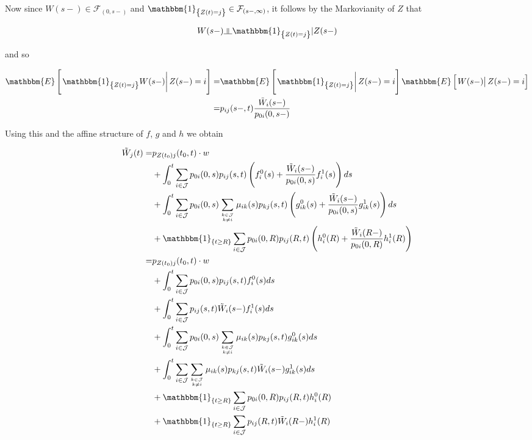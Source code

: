 \documentclass{book}
\newcommand{\indep}{\rotatebox[origin=c]{90}{$\models$}}
\newcommand{\1}[1]{\mathbbm{1}_{\left\lbrace #1 \right\rbrace}}
\newcommand{\econd}[2][def]{\mathbbm{E} \left[ \left. #1 \right| #2 \right]}
\theoremstyle{break}
\theoremstyle{remark}
\numberwithin{equation}{section}
\begin{document}
Now since $W(s-) \in  \mathcal{F}_{\left( 0,s- \right)}$ and $\1{Z(t)=j} \in \mathcal{F}_{\left( s-,\infty \right)}$, it follows by the Markovianity of $Z$ that

\begin{align*}
	W(s-) \indep \1{Z(t)=j} | Z(s-)
\end{align*}

and so

\begin{align*}
	\econd[\1{Z(t)=j}W(s-)]{Z(s-)=i} =& \econd[\1{Z(t)=j}]{Z(s-)=i} \econd[W(s-)]{Z(s-)=i} \\
	=& p_{ij}(s-,t) \frac{\tilde{W}_i(s-)}{p_{0i}(0,s-)}
\end{align*}


Using this and the affine structure of $f$, $g$ and $h$ we obtain

\begin{align}
\tilde{W}_j(t) =& p_{Z(t_0)j}(t_0,t) \cdot w \\
&+ \int_0^t \sum_{i \in \mathcal{J}} p_{0i}(0,s) p_{ij}(s,t) \left( f_i^0(s) + \frac{\tilde{W}_i(s-)}{p_{0i}(0,s)} f_i^1(s) \right) ds \\
&+ \int_0^t \sum_{i \in \mathcal{J}} p_{0i}(0,s) \sum_{k \in \mathcal{J} \atop k \neq i} \mu_{ik}(s) p_{kj}(s,t) \left( g_{ik}^0(s) + \frac{\tilde{W}_i(s-)}{p_{0i}(0,s)} g_{ik}^1(s) \right) ds \\
&+ \1{t \geq R}\sum_{i \in \mathcal{J}} p_{0i}(0,R) p_{ij}(R,t) \left( h_i^0(R) + \frac{\tilde{W}_i(R-)}{p_{0i}(0,R)} h_i^1(R) \right) \\
=& p_{Z(t_0)j}(t_0,t) \cdot w \label{FirstLineA} \\
&+ \int_0^t \sum_{i \in \mathcal{J}} p_{0i}(0,s) p_{ij}(s,t) f_i^0(s) ds \\
&+ \int_0^t \sum_{i \in \mathcal{J}} p_{ij}(s,t) \tilde{W}_i(s-) f_i^1(s) ds \\
&+ \int_0^t \sum_{i \in \mathcal{J}} p_{0i}(0,s) \sum_{k \in \mathcal{J} \atop k \neq i} \mu_{ik}(s) p_{kj}(s,t) g_{ik}^0(s) ds \\
&+ \int_0^t \sum_{i \in \mathcal{J}} \sum_{k \in \mathcal{J} \atop k \neq i} \mu_{ik}(s) p_{kj}(s,t) \tilde{W}_i(s-) g_{ik}^1(s) ds \\
&+ \1{t \geq R}\sum_{i \in \mathcal{J}} p_{0i}(0,R) p_{ij}(R,t) h_i^0(R) \label{FirstGlue} \\
&+ \1{t \geq R}\sum_{i \in \mathcal{J}} p_{ij}(R,t) \tilde{W}_i(R-) h_i^1(R) \label{SecondGlue}
\end{align}
\end{document}

